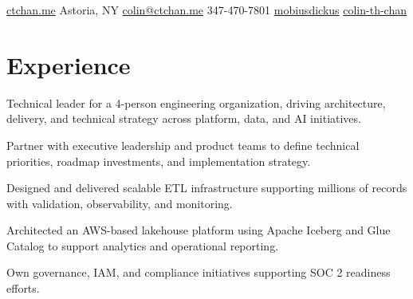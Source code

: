\documentclass[]{plushcv}
\begin{document}
%
%
{
  \contactline
  {\href{https://ctchan.me}{ctchan.me}}
  {Astoria, NY}
  {\href{mailto:colin@ctchan.me}{colin@ctchan.me}}
  {347-470-7801}
  {\href{https://www.github.com/mobiusdickus}{mobiusdickus}}
  {\href{https://www.linkedin.com/in/colin-th-chan/}{colin-th-chan}}
}

%
%

\begin{minipage}[t]{0.70\textwidth} 



\section{Experience}
\vspace{\topsep}
\begin{tightemize}
\item Technical leader for a 4-person engineering organization, driving architecture, delivery, and technical strategy across platform, data, and AI initiatives.
\item Partner with executive leadership and product teams to define technical priorities, roadmap investments, and implementation strategy.
\item Designed and delivered scalable ETL infrastructure supporting millions of records with validation, observability, and monitoring.
\item Architected an AWS-based lakehouse platform using Apache Iceberg and Glue Catalog to support analytics and operational reporting.
\item Own governance, IAM, and compliance initiatives supporting SOC 2 readiness efforts.
\end{tightemize}
\sectionsep


\end{minipage}
\end{document}
